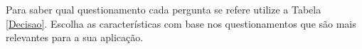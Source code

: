 Para saber qual questionamento cada pergunta se refere utilize a Tabela \ref{Decisao}. Escolha as características com base nos questionamentos que são mais relevantes para a sua aplicação.
%


